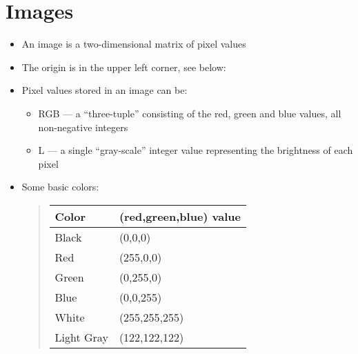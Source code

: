 \documentclass[letterpaper,10pt,english]{sphinxmanual}
\begin{document}
\section{Images}
\label{\detokenize{lecture_notes/lec07_modules_images:images}}\begin{itemize}
\item {} 
An image is a two-dimensional matrix of pixel values

\item {} 
The origin is in the upper left corner, see below:

\noindent{}

\item {} 
Pixel values stored in an image can be:
\begin{itemize}
\item {} 
RGB — a “three-tuple” consisting of the red, green and blue
values, all non-negative integers

\item {} 
L — a single “gray-scale” integer value representing the
brightness of each pixel

\end{itemize}

\item {} 
Some basic colors:
\begin{quote}


\begin{savenotes}\sphinxattablestart
\centering
\begin{tabulary}{\linewidth}[t]{|T|T|}
\hline
\sphinxstyletheadfamily 
Color
&\sphinxstyletheadfamily 
(red,green,blue) value
\\
\hline
Black
&
(0,0,0)
\\
\hline
Red
&
(255,0,0)
\\
\hline
Green
&
(0,255,0)
\\
\hline
Blue
&
(0,0,255)
\\
\hline
White
&
(255,255,255)
\\
\hline
Light Gray
&
(122,122,122)
\\
\hline
\end{tabulary}
\par
\sphinxattableend\end{savenotes}
\end{quote}

\end{itemize}
\end{document}
